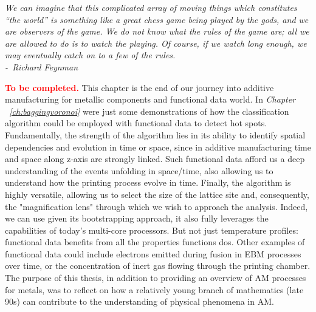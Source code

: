 \begin{minipage}{0.6\textwidth}
\small
			\textit{We can imagine that this complicated array of moving things which constitutes “the world” is something like a great chess game being played by the gods, and we are observers of the game. We do not know what the rules of the game are; all we are allowed to do is to watch the playing. Of course, if we watch long enough, we may eventually catch on to a few of the rules.
            \\[1.5ex]-~Richard Feynman}
   \\[1ex]
   \end{minipage}

\textcolor{red}{\textbf{To be completed.}}
This chapter is the end of our journey into additive manufacturing for metallic components and functional data world. In \emph{Chapter ~\ref{ch:baggingvoronoi}} were just some demonstrations of how the classification algorithm could be employed with functional data to detect hot spots. Fundamentally, the strength of the algorithm lies in its ability to identify spatial dependencies and evolution in time or space, since in additive manufacturing time and space along z-axis are strongly linked. Such functional data afford us a deep understanding of the events unfolding in space/time, also allowing us to understand how the printing process evolve in time. Finally, the algorithm is highly versatile, allowing us to select the size of the lattice site and, consequently, the "magnification lens" through which we wish to approach the analysis. Indeed, we can use given its bootstrapping approach, it also fully leverages the capabilities of today's multi-core processors. But not just temperature profiles: functional data benefits from all the properties functions dos. Other examples of functional data could include electrons emitted during fusion in EBM processes over time, or the concentration of inert gas flowing through the printing chamber.
The purpose of this thesis, in addition to providing an overview of AM processes for metals, was to reflect on how a relatively young branch of mathematics (late 90s) can contribute to the understanding of physical phenomena in AM.